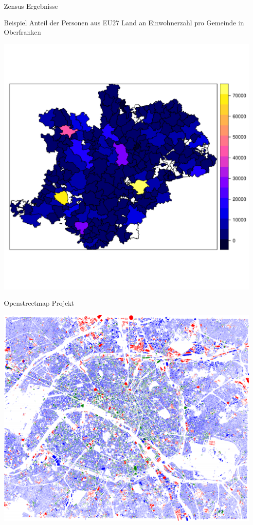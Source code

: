 \documentclass[ignorenonframetext,]{beamer}
\begin{document}
\begin{frame}{Zensus Ergebnisse}

Beispiel Anteil der Personen aus EU27 Land an Einwohnerzahl pro Gemeinde
in Oberfranken

\includegraphics{figure/KRSBamberg_EWZ.pdf}

\end{frame}

\begin{frame}{Openstreetmap Projekt}

\includegraphics{figure/Buldings_Paris.PNG}

\end{frame}
\end{document}
